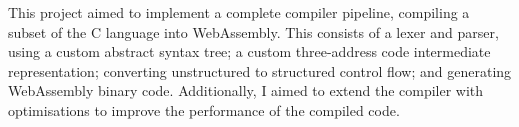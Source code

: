 \documentclass[20-proforma.tex]{subfiles}
\begin{document}
This project aimed to implement a complete compiler pipeline, compiling a subset of the C language into WebAssembly.
This consists of a lexer and parser, using a custom abstract syntax tree; a custom three-address code intermediate representation; converting unstructured to structured control flow; and generating WebAssembly binary code.
Additionally, I aimed to extend the compiler with optimisations to improve the performance of the compiled code.
\end{document}
